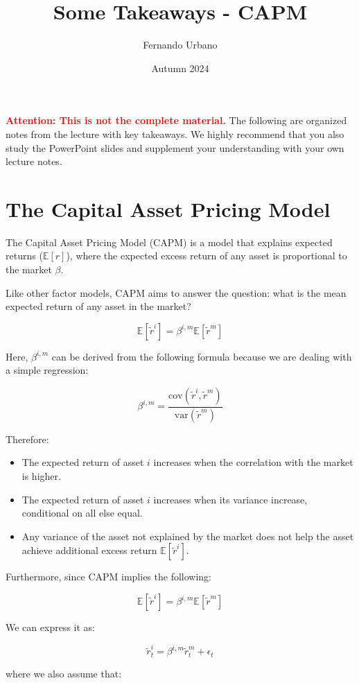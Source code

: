 \documentclass{article}
\title{Some Takeaways - CAPM}
\author{Fernando Urbano}
\date{Autumn 2024}
\newcommand{\redbold}[1]{\textbf{\textcolor{red}{#1}}}
\begin{document}
\maketitle

\redbold{Attention: This is not the complete material.} The following are organized notes from the lecture with key takeaways. We highly recommend that you also study the PowerPoint slides and supplement your understanding with your own lecture notes.

\section{The Capital Asset Pricing Model}

The Capital Asset Pricing Model (CAPM) is a model that explains expected returns ($\mathbb{E}[r]$), where the expected excess return of any asset is proportional to the market $\beta$.

Like other factor models, CAPM aims to answer the question: what is the mean expected return of any asset in the market?

$$
\mathbb{E}[\tilde{r}^i] = \beta^{i, m} \mathbb{E}[\tilde{r}^m]
$$

Here, $\beta^{i, m}$ can be derived from the following formula because we are dealing with a simple regression:

$$
\beta^{i, m} = \frac{\text{cov}(\tilde{r}^i, \tilde{r}^m)}{\text{var}(\tilde{r}^m)}
$$

Therefore:
\begin{itemize}
    \item The expected return of asset $i$ increases when the correlation with the market is higher.
    \item The expected return of asset $i$ increases when its variance increase, conditional on all else equal.
    \item Any variance of the asset not explained by the market does not help the asset achieve additional excess return $\mathbb{E}[\tilde{r}^i]$.
\end{itemize}

Furthermore, since CAPM implies the following:

$$
\mathbb{E}[\tilde{r}^i] = \beta^{i, m} \mathbb{E}[\tilde{r}^m]
$$

We can express it as:

$$
\tilde{r}_t^i = \beta^{i, m} \tilde{r}_t^m + \epsilon_t
$$

where we also assume that:
\end{document}
